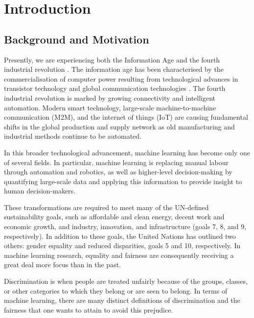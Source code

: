 
\chapter{Introduction}
\label{ch:intro}

\section{Background and Motivation}

\label{sec:intro:background}

Presently, we are experiencing both the Information Age and the fourth industrial revolution \citep{Castells:2009:Book, Hamdan:2021:Book}. The information age has been characterised by the commercialisation of computer power resulting from technological advances in transistor technology and global communication technologies \citep[p.~30]{Castells:2009:Book}. The fourth industrial revolution is marked by growing connectivity and intelligent automation. \citep{Bai:2020:IJPE} Modern smart technology, large-scale machine-to-machine communication (M2M), and the internet of things (IoT) are causing fundamental shifts in the global production and supply network as old manufacturing and industrial methods continue to be automated. 

In this broader technological advancement, machine learning has become only one of several fields.
In particular, machine learning is replacing manual labour through automation and robotics, as well as higher-level decision-making by quantifying large-scale data and applying this information to provide insight to human decision-makers. \citep{Hamdan:2021:Book}

These transformations are required to meet many of the UN-defined sustainability goals, such as affordable and clean energy, decent work and economic growth, and industry, innovation, and infrastructure (goals 7, 8, and 9, respectively). \citep{Bai:2020:IJPE} In addition to these goals, the United Nations has outlined two others: gender equality and reduced disparities, goals 5 and 10, respectively. \citep{UN:2015:Resolution} In machine learning research, equality and fairness are consequently receiving a great deal more focus than in the past. \cite{Mehrabi:2021:CSUR}

Discrimination is when people are treated unfairly because of the groups, classes, or other categories to which they belong or are seen to belong. In terms of machine learning, there are many distinct definitions of discrimination \citep{Altman:2011:doc} and the fairness that one wants to attain to avoid this prejudice. \citep{Binns:2018:PMLR}

